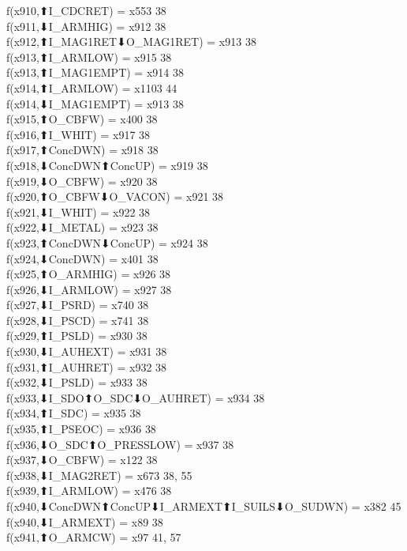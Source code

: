 f(x910,⬆I_CDCRET) = x553 {38} \\
f(x911,⬇I_ARMHIG) = x912 {38} \\
f(x912,⬆I_MAG1RET⬇O_MAG1RET) = x913 {38} \\
f(x913,⬆I_ARMLOW) = x915 {38} \\
f(x913,⬆I_MAG1EMPT) = x914 {38} \\
f(x914,⬆I_ARMLOW) = x1103 {44} \\
f(x914,⬇I_MAG1EMPT) = x913 {38} \\
f(x915,⬆O_CBFW) = x400 {38} \\
f(x916,⬆I_WHIT) = x917 {38} \\
f(x917,⬆ConcDWN) = x918 {38} \\
f(x918,⬇ConcDWN⬆ConcUP) = x919 {38} \\
f(x919,⬇O_CBFW) = x920 {38} \\
f(x920,⬆O_CBFW⬇O_VACON) = x921 {38} \\
f(x921,⬇I_WHIT) = x922 {38} \\
f(x922,⬇I_METAL) = x923 {38} \\
f(x923,⬆ConcDWN⬇ConcUP) = x924 {38} \\
f(x924,⬇ConcDWN) = x401 {38} \\
f(x925,⬆O_ARMHIG) = x926 {38} \\
f(x926,⬇I_ARMLOW) = x927 {38} \\
f(x927,⬇I_PSRD) = x740 {38} \\
f(x928,⬇I_PSCD) = x741 {38} \\
f(x929,⬆I_PSLD) = x930 {38} \\
f(x930,⬇I_AUHEXT) = x931 {38} \\
f(x931,⬆I_AUHRET) = x932 {38} \\
f(x932,⬇I_PSLD) = x933 {38} \\
f(x933,⬇I_SDO⬆O_SDC⬇O_AUHRET) = x934 {38} \\
f(x934,⬆I_SDC) = x935 {38} \\
f(x935,⬆I_PSEOC) = x936 {38} \\
f(x936,⬇O_SDC⬆O_PRESSLOW) = x937 {38} \\
f(x937,⬇O_CBFW) = x122 {38} \\
f(x938,⬇I_MAG2RET) = x673 {38, 55} \\
f(x939,⬆I_ARMLOW) = x476 {38} \\
f(x940,⬇ConcDWN⬆ConcUP⬇I_ARMEXT⬆I_SUILS⬇O_SUDWN) = x382 {45} \\
f(x940,⬇I_ARMEXT) = x89 {38} \\
f(x941,⬆O_ARMCW) = x97 {41, 57} \\
